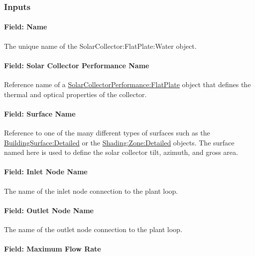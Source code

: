 \subsubsection{Inputs}\label{inputs-045}

\paragraph{Field: Name}\label{field-name-044}

The unique name of the SolarCollector:FlatPlate:Water object.

\paragraph{Field: Solar Collector Performance Name}\label{field-solar-collector-performance-name}

Reference name of a \hyperref[solarcollectorperformanceflatplate]{SolarCollectorPerformance:FlatPlate} object that defines the thermal and optical properties of the collector.

\paragraph{Field: Surface Name}\label{field-surface-name-005}

Reference to one of the many different types of surfaces such as the \hyperref[buildingsurfacedetailed]{BuildingSurface:Detailed} or the \hyperref[shadingzonedetailed-000]{Shading:Zone:Detailed} objects. The surface named here is used to define the solar collector tilt, azimuth, and gross area.

\paragraph{Field: Inlet Node Name}\label{field-inlet-node-name-007}

The name of the inlet node connection to the plant loop.

\paragraph{Field: Outlet Node Name}\label{field-outlet-node-name-008}

The name of the outlet node connection to the plant loop.

\paragraph{Field: Maximum Flow Rate}\label{field-maximum-flow-rate-002}

